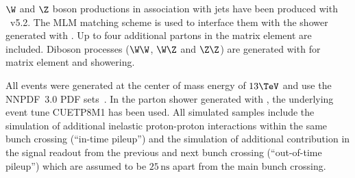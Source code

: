 $\W$ and $\Z$ boson productions in association with jets have been produced with \MADGRAPH~v5.2.
The MLM matching scheme is used to interface them with the shower generated with \PYTHIA.
Up to four additional partons in the matrix element are included.
Diboson processes ($\W\W$, $\W\Z$ and $\Z\Z$) are generated
with \PYTHIA for matrix element and showering.

All events were generated at the center of mass 
energy of $13\TeV$ and use the NNPDF~3.0 PDF sets~\cite{Ball:2014uwa}.
In the parton shower generated with \PYTHIA, the underlying event tune CUETP8M1 has been used.
All simulated samples include the simulation of additional inelastic proton-proton interactions
within the same bunch crossing (``in-time pileup'') and the simulation
of additional contribution in the signal readout from the previous and next bunch crossing (``out-of-time pileup'')
which are assumed to be $25\,\text{ns}$ apart from the main bunch crossing.
